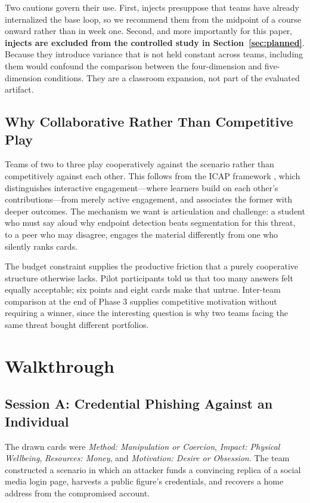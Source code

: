 \documentclass[10pt,twocolumn,letterpaper]{article}
\begin{document}
Two cautions govern their use. First, injects presuppose that teams have already
internalized the base loop, so we recommend them from the midpoint of a course
onward rather than in week one. Second, and more importantly for this paper,
\textbf{injects are excluded from the controlled study in
Section~\ref{sec:planned}}. Because they introduce variance that is not held
constant across teams, including them would confound the comparison between the
four-dimension and five-dimension conditions. They are a classroom expansion,
not part of the evaluated artifact.

\subsection{Why Collaborative Rather Than Competitive Play}

Teams of two to three play cooperatively against the scenario rather than
competitively against each other. This follows from the ICAP framework
\cite{chi2014icap}, which distinguishes interactive engagement---where learners
build on each other's contributions---from merely active engagement, and
associates the former with deeper outcomes. The mechanism we want is
articulation and challenge: a student who must say aloud why endpoint detection
beats segmentation for this threat, to a peer who may disagree, engages the
material differently from one who silently ranks cards.

The budget constraint supplies the productive friction that a purely
cooperative structure otherwise lacks. Pilot participants told us that too many
answers felt equally acceptable; six points and eight cards make that untrue.
Inter-team comparison at the end of Phase 3 supplies competitive motivation
without requiring a winner, since the interesting question is why two teams
facing the same threat bought different portfolios.

\section{Walkthrough}
\label{sec:walkthrough}

\subsection{Session A: Credential Phishing Against an Individual}

The drawn cards were \emph{Method: Manipulation or Coercion}, \emph{Impact:
Physical Wellbeing}, \emph{Resources: Money}, and \emph{Motivation: Desire or
Obsession}. The team constructed a scenario in which an attacker funds a
convincing replica of a social media login page, harvests a public figure's
credentials, and recovers a home address from the compromised account.
\end{document}
